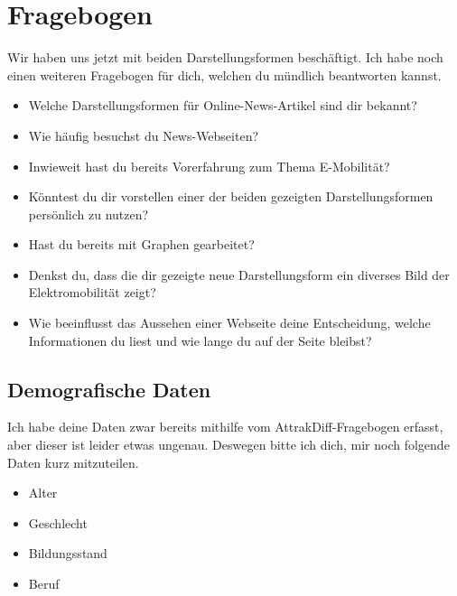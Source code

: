 \section{Fragebogen}\label{sec:fragebogen}
Wir haben uns jetzt mit beiden Darstellungsformen beschäftigt.
Ich habe noch einen weiteren Fragebogen für dich, welchen du mündlich beantworten kannst.
\begin{itemize}
    \item Welche Darstellungsformen für Online-News-Artikel sind dir bekannt?
    \item Wie häufig besuchst du News-Webseiten?
    \item Inwieweit hast du bereits Vorerfahrung zum Thema E-Mobilität?
    \item Könntest du dir vorstellen einer der beiden gezeigten Darstellungsformen persönlich zu nutzen?
    \item Hast du bereits mit Graphen gearbeitet?
    \item Denkst du, dass die dir gezeigte neue Darstellungsform ein diverses Bild der Elektromobilität zeigt?
    \item Wie beeinflusst das Aussehen einer Webseite deine Entscheidung, welche Informationen du liest und wie lange du auf der Seite bleibst?
\end{itemize}

\subsection{Demografische Daten}
Ich habe deine Daten zwar bereits mithilfe vom AttrakDiff-Fragebogen erfasst, aber dieser ist leider etwas ungenau.
Deswegen bitte ich dich, mir noch folgende Daten kurz mitzuteilen.
\begin{itemize}
    \item Alter
    \item Geschlecht
    \item Bildungsstand
    \item Beruf
\end{itemize}

